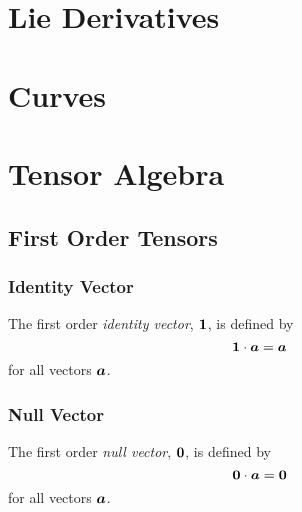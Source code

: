 \section{Lie Derivatives}


\section{Curves}


\section{Tensor Algebra}
\label{sec:TensorAlgebra}

\subsection{First Order Tensors}
\label{subsec:TensorAlgebraFirstOrder}

\subsubsection{Identity Vector}
\label{subsubsec:IdentityTensorFirstOrder}

The first order \emph{identity vector}, $  \boldsymbol{1}  $, is defined by
\begin{equation}
  \dotprod{\identitytensorone}{\vectr{a}}=\vectr{a}
  \label{eqn:DefinitionIdentityFirstOrder}
\end{equation}
for all vectors $ \boldsymbol{a} $.

\subsubsection{Null Vector}
\label{subsubsec:NullTensorFirstOrder}

The first order \emph{null vector}, $  \boldsymbol{ 0 }  $, is defined by
\begin{equation}
  \dotprod{\nulltensorone}{\vectr{a}}=\nulltensorone
  \label{eqn:DefinitionNullFirstOrder}
\end{equation}
for all vectors $ \boldsymbol{a} $.

